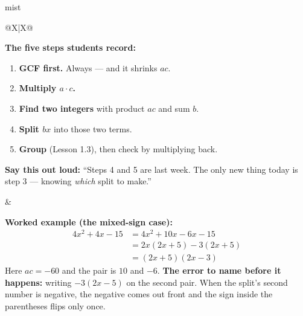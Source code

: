 \documentclass[10pt]{article}
\begin{document}
\boxguard
\begin{skillbox}{mist}
\begin{tabularx}{\linewidth}{@{}X|X@{}}
\begin{minipage}[t]{\linewidth}\vspace{0pt}
\textbf{The five steps students record:}
\begin{enumerate}[leftmargin=1.4em, itemsep=2pt, topsep=2pt]
  \item \textbf{GCF first.} Always --- and it shrinks $ac$.
  \item \textbf{Multiply $a \cdot c$.}
  \item \textbf{Find two integers} with product $ac$ and sum $b$.
  \item \textbf{Split $bx$} into those two terms.
  \item \textbf{Group} (Lesson 1.3), then check by multiplying back.
\end{enumerate}
\textbf{Say this out loud:} ``Steps 4 and 5 are last week. The only new thing today is step 3 ---
knowing \emph{which} split to make.''
\end{minipage}
&
\begin{minipage}[t]{\linewidth}\vspace{0pt}
\textbf{Worked example (the mixed-sign case):}
\[
\begin{aligned}
4x^2+4x-15 &= 4x^2+10x-6x-15 \\
           &= 2x(2x+5) - 3(2x+5) \\
           &= (2x+5)(2x-3)
\end{aligned}
\]
Here $ac=-60$ and the pair is $10$ and $-6$. \textbf{The error to name before it happens:} writing
$-3(2x-5)$ on the second pair. When the split's second number is negative, the negative comes out
front and the sign inside the parentheses flips only once.
\end{minipage}
\end{tabularx}
\end{skillbox}
\end{document}
